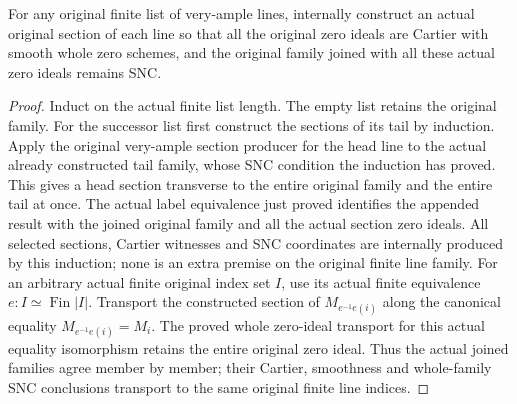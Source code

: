 \begin{theorem}
\label{thm:kn-nadel-bertini-auxiliary-finite-sections}
\leanok
{}
For any original finite list of very-ample lines, internally construct
an actual original section of each line so that all the original zero
ideals are Cartier with smooth whole zero schemes, and the original
family joined with all these actual zero ideals remains SNC.
\end{theorem}
\begin{proof}
Induct on the actual finite list length. The empty list retains the
original family. For the successor list first construct the sections
of its tail by induction. Apply the original very-ample section
producer for the head line to the actual already constructed tail
family, whose SNC condition the induction has proved. This gives a
head section transverse to the entire original family and the entire
tail at once. The actual label equivalence just proved identifies the
appended result with the joined original family and all the actual
section zero ideals. All selected sections, Cartier witnesses and SNC
coordinates are internally produced by this induction; none is an
extra premise on the original finite line family.
For an arbitrary actual finite original index set $I$, use its actual
finite equivalence $e:I\simeq\operatorname{Fin}|I|$. Transport the
constructed section of $M_{e^{-1}e(i)}$ along the canonical equality
$M_{e^{-1}e(i)}=M_i$. The proved whole zero-ideal transport for this
actual equality isomorphism retains the entire original zero ideal.
Thus the actual joined families agree member by member; their Cartier,
smoothness and whole-family SNC conclusions transport to the same
original finite line indices.
\end{proof}

